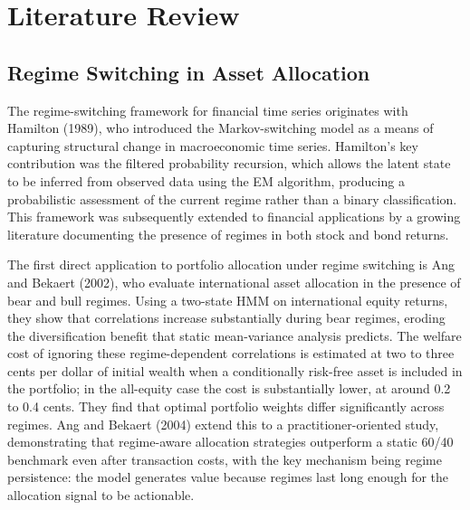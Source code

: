 \documentclass[12pt, a4paper]{article}
\begin{document}
\clearpage
\clearpage
\section{Literature Review}
\label{sec:litreview}

\subsection{Regime Switching in Asset Allocation}

The regime-switching framework for financial time series originates with Hamilton (1989),
who introduced the Markov-switching model as a means of capturing structural change in
macroeconomic time series. Hamilton's key contribution was the filtered probability recursion,
which allows the latent state to be inferred from observed data using the EM algorithm,
producing a probabilistic assessment of the current regime rather than a binary classification.
This framework was subsequently extended to financial applications by a growing literature
documenting the presence of regimes in both stock and bond returns.

The first direct application to portfolio allocation under regime switching is Ang and
Bekaert (2002), who evaluate international asset allocation in the presence of bear and bull
regimes. Using a two-state HMM on international equity returns, they show that correlations
increase substantially during bear regimes, eroding the diversification benefit that static
mean-variance analysis predicts. The welfare cost of ignoring these regime-dependent
correlations is estimated at two to three cents per dollar of initial wealth when a
conditionally risk-free asset is included in the portfolio; in the all-equity case the cost
is substantially lower, at around 0.2 to 0.4 cents. They find that optimal portfolio weights
differ significantly across regimes. Ang and Bekaert (2004) extend this to a
practitioner-oriented study, demonstrating that regime-aware allocation strategies outperform
a static 60/40 benchmark even after transaction costs, with the key mechanism being regime
persistence: the model generates value because regimes last long enough for the allocation
signal to be actionable.
\end{document}
